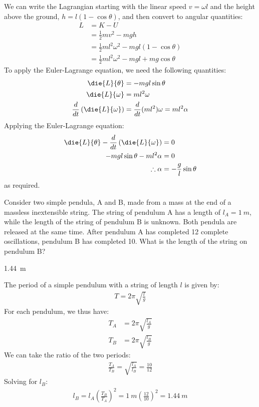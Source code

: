 \begin{solution}
We can write the Lagrangian starting with the linear speed $v=\omega l$ and the height above the ground, $h=l (1 -\cos \theta)$, and then convert to angular quantities:
\begin{align*}
L &= K - U\\
  &= \frac{1}{2} m v^2 - mgh \\
  &= \frac{1}{2} m l^2 \omega^2 - mg l (1 -\cos \theta)\\
  &= \frac{1}{2} m l^2 \omega^2 - mgl + mg\cos\theta
\end{align*}
To apply the Euler-Lagrange equation, we need the following quantities:
\begin{align*}
\die{L}{\theta} &= - mg l \sin\theta\\
\die{L}{\omega} &= m l^2 \omega \\
\frac{d}{dt} \left(\die{L}{\omega} \right) &=\frac{d}{dt}( m l^2) \omega=ml^2\alpha
\end{align*}
Applying the Euler-Lagrange equation:
\begin{align*}
\die{L}{\theta} - \frac{d}{dt} \left(\die{L}{\omega} \right) &= 0\\ 
- mg l \sin\theta - m l^2 \alpha &= 0\\
\therefore \alpha &= -\frac{g}{l} \sin \theta
\end{align*}
as required.
\end{solution}

\question Consider two simple pendula, A and B, made from a mass at the end of a massless inextensible string. The string of pendulum A has a length of $l_A=\SI{1}{m}$, while the length of the string of pendulum B is unknown. Both pendula are released at the same time. After pendulum A has completed 12 complete oscillations, pendulum B has completed 10. What is the length of the string on pendulum B?
\begin{finalanswer}
\SI{1.44}{m}
\end{finalanswer}
\begin{solution}
The period of a simple pendulum with a string of length $l$ is given by:
\begin{align*}
 T = 2\pi\sqrt{\frac{l}{g}}
\end{align*}
For each pendulum, we thus have:
\begin{align*}
T_A &= 2\pi\sqrt{\frac{l_A}{g}}\\
T_B &= 2\pi\sqrt{\frac{l_B}{g}}
\end{align*}
We can take the ratio of the two periods:
\begin{align*}
\frac{T_A}{T_B} = \sqrt{\frac{l_A}{l_B}} = \frac{10}{12}
\end{align*}
Solving for $l_B$:
\begin{align*}
l _B = l_A \left( \frac{T_B}{T_A} \right)^2 = \SI{1}{m}\left(\frac{12}{10} \right)^2=\SI{1.44}{m}
\end{align*}
\end{solution}

